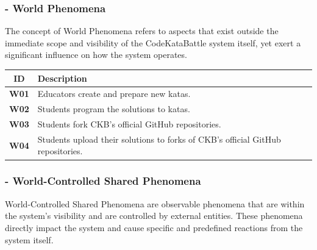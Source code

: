 \documentclass[11pt]{report}
\begin{document}
    \subsubsection*{- World Phenomena}
    The concept of World Phenomena refers to aspects that exist outside the immediate scope and visibility of the CodeKataBattle system itself,
    yet exert a significant influence on how the system operates.
    \begin{center}
    \begin{tabular}{|c|p{12cm}|}
    \hline
    \rowcolor{gray!20} %
    \textbf{ID} & \textbf{Description} \\ \hline
    \textbf{W01} & Educators create and prepare new katas. \\
    \hline
    \textbf{W02} & Students program the solutions to katas. \\
    \hline
    \textbf{W03} & Students fork CKB's official GitHub repositories. \\
    \hline
    \textbf{W04} & Students upload their solutions to forks of CKB's official GitHub repositories. \\
    \hline
    \end{tabular}
    \end{center}


    \subsubsection*{- World-Controlled Shared Phenomena}
    World-Controlled Shared Phenomena are observable phenomena that are within the system's visibility and are controlled by external entities.
    These phenomena directly impact the system and cause specific and predefined reactions from the system itself.
\end{document}
